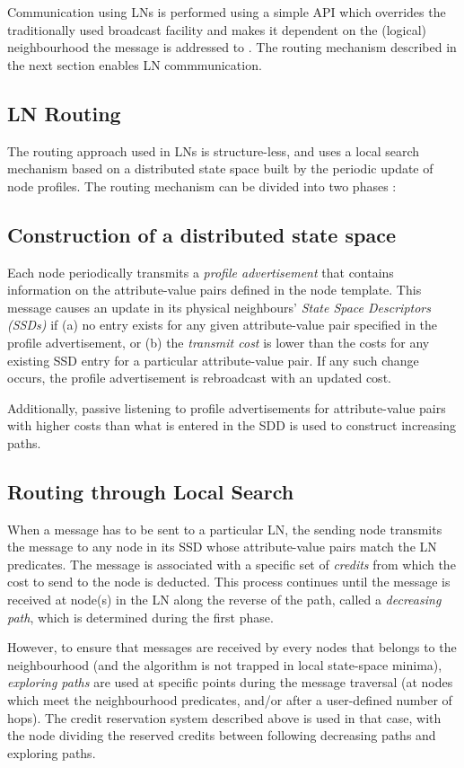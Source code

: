 Communication using LNs is performed using a simple API which overrides the
traditionally used broadcast facility and makes it dependent on the (logical)
neighbourhood the message is addressed to \cite{mottola_LN:2006}. The routing mechanism described in
the next section enables LN commmunication.

\subsection{LN Routing}

The routing approach used in LNs is structure-less, and uses a local search
mechanism based on a distributed state space built by the periodic update of
node profiles. The routing mechanism can be divided into two phases \cite{mottola_LNAbstraction}:

\subsection{Construction of a distributed state space}
Each node periodically transmits a \emph{profile advertisement} that contains
information on the attribute-value pairs defined in the node template. This
message causes an update in its physical neighbours' \emph{State Space
Descriptors (SSDs)} if (a) no entry exists for any given attribute-value pair
specified in the profile advertisement, or (b) the \emph{transmit cost} is lower
than the costs for any existing SSD entry for a particular attribute-value pair.
If any such change occurs, the profile advertisement is rebroadcast with an
updated cost.

Additionally, passive listening to profile advertisements for attribute-value
pairs with higher costs than what is entered in the SDD is used to construct
increasing paths.

\subsection{ Routing through Local Search}
When a message has to be sent to a particular LN, the sending node transmits the
message to any node in its SSD whose attribute-value pairs match the LN
predicates. The message is associated with a specific set of \emph{credits} from
which the cost to send to the node is deducted. This process continues until the
message is received at node(s) in the LN along the reverse of the path, called
a \emph{decreasing path}, which is determined during the first phase. 

However, to ensure that messages are received by every nodes that belongs to the
neighbourhood (and the algorithm is not trapped in local state-space minima),
\emph{exploring paths} are used at specific points during the message traversal
(at nodes which meet the neighbourhood predicates, and/or after a user-defined
number of hops). The credit reservation system described above is used in that
case, with the node dividing the reserved credits between following decreasing
paths and exploring paths.

